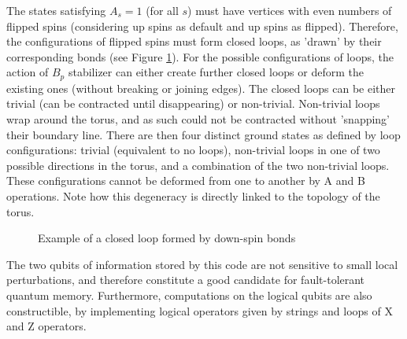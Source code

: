 The states satisfying $A_s=1$ (for all $s$) must have vertices with even numbers of flipped spins (considering up spins as default and up spins as flipped). Therefore, the configurations of flipped spins must form closed loops, as 'drawn' by their corresponding bonds (see Figure \ref{fig:toric_code_loop}). For the possible configurations of loops, the action of $B_p$ stabilizer can either create further closed loops or deform the existing ones (without breaking or joining edges). The closed loops can be either trivial (can be contracted until disappearing) or non-trivial. Non-trivial loops wrap around the torus, and as such could not be contracted without 'snapping' their boundary line. There are then four distinct ground states as defined by loop configurations: trivial (equivalent to no loops), non-trivial loops in one of two possible directions in the torus, and a combination of the two non-trivial loops. These configurations cannot be deformed from one to another by A and B operations. Note how this degeneracy is directly linked to the topology of the torus.

\begin{figure}
    \centering

    \caption{Example of a closed loop formed by down-spin bonds}
    \label{fig:toric_code_loop}
\end{figure}

The two qubits of information stored by this code are not sensitive to small local perturbations, and therefore constitute a good candidate for fault-tolerant quantum memory. Furthermore, computations on the logical qubits are also constructible, by implementing logical operators given by strings and loops of X and Z operators\cite{Herringer2020}.

